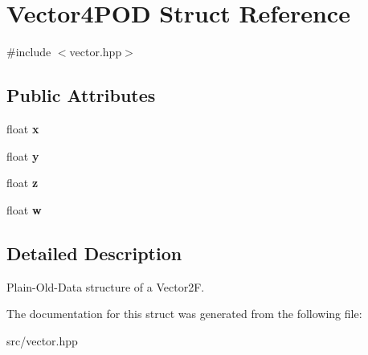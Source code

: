 \hypertarget{struct_vector4_p_o_d}{}\section{Vector4\+P\+OD Struct Reference}
\label{struct_vector4_p_o_d}


{\ttfamily \#include $<$vector.\+hpp$>$}

\subsection*{Public Attributes}
\begin{DoxyCompactItemize}
\item 
\mbox{\label{struct_vector4_p_o_d_a0a0ef8c9a27e473ae8e2c0efd0e15cfa}} 
float {\bfseries x}
\item 
\mbox{\label{struct_vector4_p_o_d_af4520f03d79619dd11ec032720292a36}} 
float {\bfseries y}
\item 
\mbox{\label{struct_vector4_p_o_d_a057be9df17dcb0d5433e79d451ecea2d}} 
float {\bfseries z}
\item 
\mbox{\label{struct_vector4_p_o_d_a4d2328ef400928e608235529d43a7a40}} 
float {\bfseries w}
\end{DoxyCompactItemize}


\subsection{Detailed Description}
Plain-\/\+Old-\/\+Data structure of a Vector2F. 

The documentation for this struct was generated from the following file\+:\begin{DoxyCompactItemize}
\item 
src/vector.\+hpp\end{DoxyCompactItemize}
